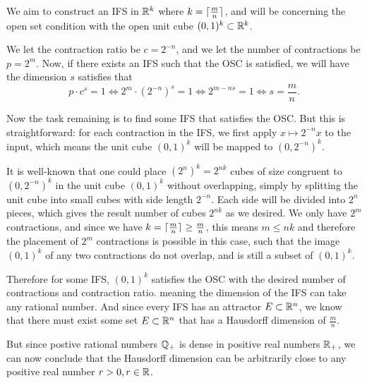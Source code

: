 We aim to construct an IFS in \(\mathbb{R}^k\) where \(k = \lceil\frac{m}{n}\rceil\), and will be concerning the open set condition with the open unit cube \((0, 1)^k \subset \mathbb{R}^k\).

We let the contraction ratio be \(c = 2^{-n}\), and we let the number of contractions be \(p = 2^m\). Now, if there exists an IFS such that the OSC is satisfied, we will have the dimension \(s\) satisfies that
\[
p \cdot c^s = 1 \iff 2^m \cdot \left(2^{-n}\right)^s = 1 \iff 2^{m-ns} = 1 \iff s = \frac{m}{n}.
\]

Now the task remaining is to find some IFS that satisfies the OSC. But this is straightforward: for each contraction in the IFS, we first apply \(x \mapsto 2^{-n}x\) to the input, which means the unit cube \((0, 1)^k\) will be mapped to \(\left(0, 2^{-n}\right)^k\).

It is well-known that one could place \((2^n)^k = 2^{nk}\) cubes of size congruent to \(\left(0, 2^{-n}\right)^k\) in the unit cube \((0, 1)^k\) without overlapping, simply by splitting the unit cube into small cubes with side length \(2^{-n}\). Each side will be divided into \(2^n\) pieces, which gives the result number of cubes \(2^{nk}\) as we desired. We only have \(2^m\) contractions, and since we have \(k = \lceil\frac{m}{n}\rceil \geq \frac{m}{n}\), this means \(m \leq nk\) and therefore the placement of \(2^m\) contractions is possible in this case, such that the image \((0, 1)^k\) of any two contractions do not overlap, and is still a subset of \((0, 1)^k\).

Therefore for some IFS, \((0, 1)^k\) satisfies the OSC with the desired number of contractions and contraction ratio. meaning the dimension of the IFS can take any rational number. And since every IFS has an attractor \(E \subset \mathbb{R}^n\), we know that there must exist some set \(E \subset \mathbb{R}^n\) that has a Hausdorff dimension of \(\frac{m}{n}\).

But since postive rational numbers \(\mathbb{Q}_+\) is dense in positive real numbers \(\mathbb{R}_+\), we can now conclude that the Hausdorff dimension can be arbitrarily close to any positive real number \(r > 0, r \in \mathbb{R}\).